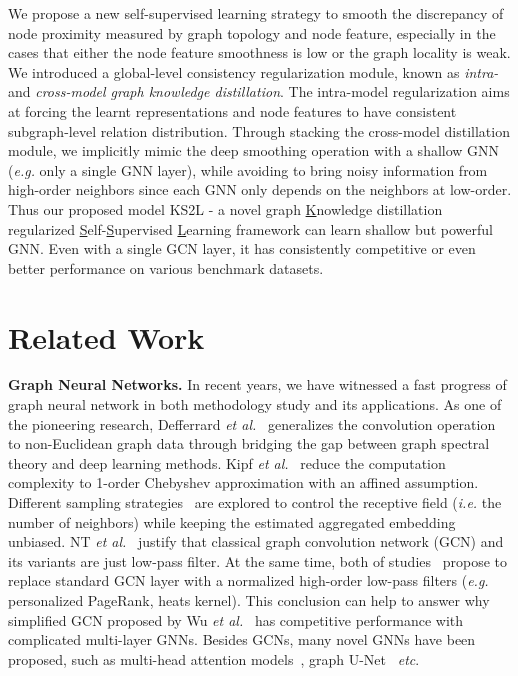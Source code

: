\documentclass[preprint]{article}
\begin{document}
We propose a new self-supervised  learning strategy to smooth the discrepancy of node proximity measured by graph topology and node feature, especially in the cases that either the node feature smoothness is low or the graph locality is weak. We introduced a global-level consistency regularization module, known as \emph{intra-} and \emph{cross-model graph knowledge distillation}. The intra-model regularization aims at forcing the learnt representations and node features to have consistent subgraph-level relation distribution. Through stacking the cross-model distillation module, we implicitly mimic the deep smoothing operation with a shallow GNN (\emph{e.g.} only a single GNN layer), while avoiding to bring noisy information from high-order neighbors since each GNN only depends on the neighbors at low-order. Thus our proposed model KS2L - a novel graph \underline{K}nowledge distillation regularized \underline{S}elf-\underline{S}upervised \underline{L}earning framework  can learn shallow but powerful GNN. Even with a single GCN layer, it has consistently competitive or even better performance on various benchmark datasets.

\section{Related Work} \label{sec:relatedwork}
\textbf{Graph Neural Networks.}  In recent years, we have witnessed a fast progress of graph neural network in both methodology study and its applications. As one of the pioneering research, Defferrard \emph{et al.}~\cite{defferrard2016convolutional} generalizes the convolution operation to non-Euclidean graph data through bridging the gap between graph spectral theory and deep learning methods. Kipf \emph{et al.}~\cite{kipf2016semi} reduce the computation complexity to 1-order Chebyshev approximation with an affined assumption. Different sampling strategies~\cite{chen2018fastgcn} are explored to control the receptive field (\emph{i.e.} the number of neighbors) while keeping the estimated aggregated embedding unbiased. NT \emph{et al.}~\cite{Hoang:2019:LPF} justify that classical graph convolution network (GCN) and its variants are just low-pass filter. At the same time, both of studies~\cite{li:2019:label,klicpera:2019:diffusion} propose to replace standard GCN layer with a normalized high-order low-pass filters (\emph{e.g.} personalized PageRank, heats kernel). This conclusion can help to answer why simplified GCN proposed by Wu \emph{et al.}~\cite{wu2019simplifying} has competitive performance with complicated multi-layer GNNs. Besides GCNs, many novel GNNs have been proposed, such as multi-head attention models~\cite{velivckovic2017graph,ma2019disentangled}, graph U-Net~\cite{gao2019graph} \emph{etc}.
\end{document}

